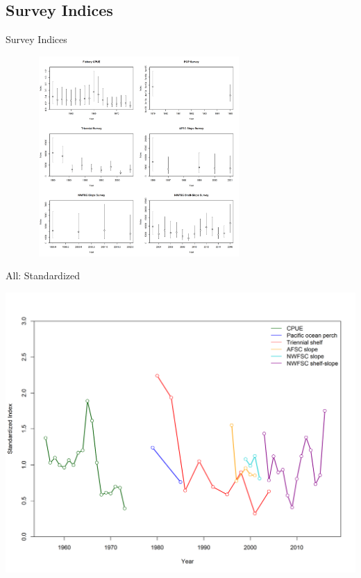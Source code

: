 \documentclass[pdf]{beamer}\usepackage[]{graphicx}\usepackage[]{color}
\begin{document}
\subsection{Survey Indices}
\begin{frame}{Survey Indices}
  \begin{center}
  \includegraphics[height = 3in, width = 4in]{figures/Index_Data.png}
  \end{center}
\end{frame}

\begin{frame}{All: Standardized}
  \begin{center}
  \includegraphics[scale = 0.37]{figures/Index_Standardized.png}
  \end{center}
\end{frame}


\end{document}
